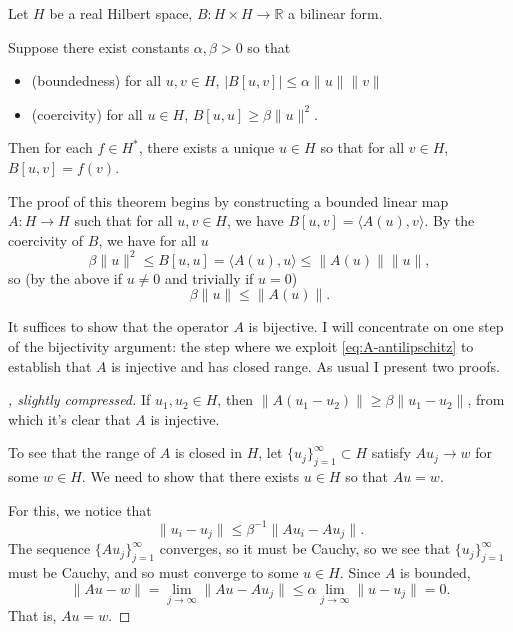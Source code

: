\documentclass[12pt]{llncs}
\begin{document}
Let $H$ be a real Hilbert space, $B : H \times H \to \mathbb{R}$ a bilinear form.

\begin{theorem} Suppose there exist constants $\alpha, \beta > 0$ so that
\begin{itemize}
  \item (boundedness) for all $u,v\in H$, $|B[u, v]| \le \alpha \|u\| \|v\|$
  \item (coercivity) for all $u \in H$, $B[u, u]\geq \beta\|u\|^2$.
\end{itemize}
Then for each $f \in H^*$, there exists a unique $u \in H$ so that
for all $v \in H$, $B[u, v] = f(v)$.
\end{theorem}


The proof of this theorem
begins by constructing a bounded linear map $A:H\to H$ such that for all $u,v\in H$,
we have $B[u,v]=\langle A(u),v\rangle$.
By the coercivity of $B$, we have for all $u$
\[
\beta\|u\|^2\le B[u, u]=\langle A(u), u\rangle \le \|A(u)\| \|u\|,
\]
so (by the above if $u\ne 0$ and trivially if $u = 0$)
\begin{equation}
  \beta\|u\|\le \|A(u)\|.\label{eq:A-antilipschitz}
\end{equation}

It suffices to show that the operator $A$ is bijective.
I will concentrate on one step of the bijectivity argument:
the step where we exploit \cref{eq:A-antilipschitz} to establish that $A$
is injective and has closed range.
As usual I present two proofs.

\begin{proof}[\cite{How20}, slightly compressed]
If $u_1, u_2 \in H$,
then $\lVert A(u_1 - u_2)\rVert \geq \beta \lVert u_1 - u_2\rVert$,
from which it's clear that $A$ is injective.

To see that the range of $A$ is closed in $H$,
let $\{u_j\}_{j=1}^\infty\subset H$ satisfy $Au_j \to w$ for some $w \in H$.
We need to show that there exists $u \in H$
so that $Au = w$.

For this, we notice that
\[
  \lVert u_i - u_j \rVert \le \beta^{-1} \lVert Au_i - Au_j \rVert.
\]
The sequence $\{Au_j\}_{j=1}^\infty$ converges, so it must be Cauchy,
so we see that $\{u_j\}_{j=1}^\infty$ must be Cauchy,
and so must converge to some $u \in H$.
Since $A$ is bounded,
\[
\lVert Au - w \rVert 
= \lim_{j\to\infty} \lVert Au - Au_j \rVert 
\le \alpha \lim_{j\to \infty} \lVert u - u_j\rVert
= 0.
\]
That is, $Au = w$. 
\end{proof}
\end{document}
